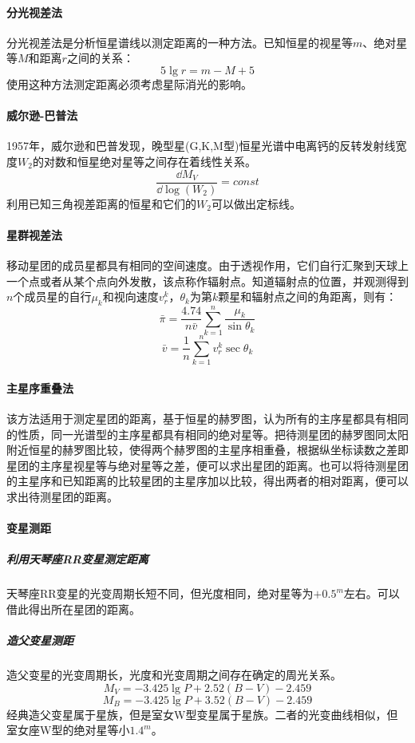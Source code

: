 \paragraph{分光视差法}分光视差法是分析恒星谱线以测定距离的一种方法。已知恒星的视星等$m$、绝对星等$M$和距离$r$之间的关系：
\begin{equation}
	5\lg r=m-M+5
\end{equation}
使用这种方法测定距离必须考虑星际消光的影响。
\paragraph{威尔逊-巴普法}
1957年，威尔逊和巴普发现，晚型星(G,K,M型)恒星光谱中电离钙的反转发射线宽度$W_{2}$的对数和恒星绝对星等之间存在着线性关系。
\begin{equation}
	\frac{\dd M_{V}}{\dd \log (W_{2})}=const
\end{equation}
利用已知三角视差距离的恒星和它们的$W_{2}$可以做出定标线。
\paragraph{星群视差法}
移动星团的成员星都具有相同的空间速度。由于透视作用，它们自行汇聚到天球上一个点或者从某个点向外发散，该点称作辐射点。知道辐射点的位置，并观测得到$n$个成员星的自行$\mu_{k}$和视向速度$v_{r}^k$，$\theta_{k}$为第$k$颗星和辐射点之间的角距离，则有：
\begin{equation}
	\bar{\pi}=\frac{4.74}{n\bar{v}}\sum_{k=1}^{n}\frac{\mu_{k}}{\sin\theta_{k}}
\end{equation}
\begin{equation}
	\bar{v}=\frac{1}{n}\sum_{k=1}^{n}v_{r}^k\sec\theta_{k}
\end{equation}
\paragraph{主星序重叠法}
该方法适用于测定星团的距离，基于恒星的赫罗图，认为所有的主序星都具有相同的性质，同一光谱型的主序星都具有相同的绝对星等。把待测星团的赫罗图同太阳附近恒星的赫罗图比较，使得两个赫罗图的主星序相重叠，根据纵坐标读数之差即星团的主序星视星等与绝对星等之差，便可以求出星团的距离。也可以将待测星团的主星序和已知距离的比较星团的主星序加以比较，得出两者的相对距离，便可以求出待测星团的距离。
\paragraph{变星测距}

\subparagraph{利用天琴座RR变星测定距离}天琴座RR变星的光变周期长短不同，但光度相同，绝对星等为$+0.5^m$左右。可以借此得出所在星团的距离。
\subparagraph{造父变星测距}造父变星的光变周期长，光度和光变周期之间存在确定的周光关系。
\begin{equation}
	M_{V}=-3.425\lg P +2.52(B-V)-2.459
\end{equation}
\begin{equation}
	M_{B}=-3.425\lg P +3.52(B-V)-2.459
\end{equation}
经典造父变星属于星族，但是室女W型变星属于星族。二者的光变曲线相似，但室女座W型的绝对星等小$1.4^m$。
